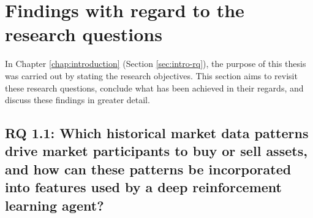 \section{Findings with regard to the research questions}

In Chapter \ref{chap:introduction} (Section \ref{sec:intro-rq}), the purpose of this thesis was carried out by stating the research objectives.
This section aims to revisit these research questions, conclude what has been achieved in their regards, and discuss these findings in greater detail.

\subsection{RQ 1.1: Which historical market data patterns drive market participants to buy or sell assets, and how can these patterns be incorporated into features used by a deep reinforcement learning agent?}

